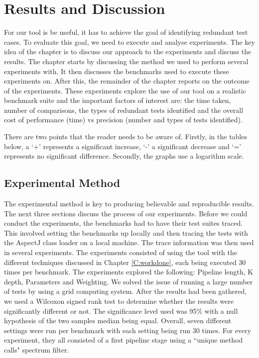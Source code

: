 \chapter{Results and Discussion}\label{C:results}\label{C:evaluation}

For our tool is be useful, it has to achieve the goal of identifying redundant test cases. To evaluate this goal, we need to execute and analyse experiments. The key idea of the chapter is to discuss our approach to the experiments and discuss the results. The chapter starts by discussing the method we used to perform several experiments with. It then discusses the benchmarks used to execute these experiments on. After this, the remainder of the chapter reports on the outcome of the experiments. These experiments explore the use of our tool on a realistic benchmark suite and the important factors of interest are: the time taken, number of comparisons, the types of redundant tests identified and the overall cost of performance (time) vs precision (number and types of tests identified).

There are two points that the reader needs to be aware of. Firstly, in the tables below, a `+' represents a significant increase, `-' a significant decrease and `=' represents no significant difference. Secondly, the graphs use a logarithm scale.

\section{Experimental Method}

The experimental method is key to producing believable and reproducible results. The next three sections discuss the process of our experiments. Before we could conduct the experiments, the benchmarks had to have their test suites traced. This involved setting the benchmarks up locally and then tracing the tests with the AspectJ class loader on a local machine. The trace information was then used in several experiments. The experiments consisted of using the tool with the different techniques discussed in Chapter \ref{C:workdone}, each being executed 30 times per benchmark. The experiments explored the following: Pipeline length, K depth, Parameters and Weighting. We solved the issue of running a large number of tests by using a grid computing system. After the results had been gathered, we used a Wilcoxon signed rank test \cite{wilcoxon1945individual} to determine whether the results were significantly different or not. The significance level used was 95\% with a null hypothesis of the two samples median being equal. Overall, seven different settings were run per benchmark with each setting being run 30 times. For every experiment, they all consisted of a first pipeline stage using a ``unique method calls" spectrum filter. 

